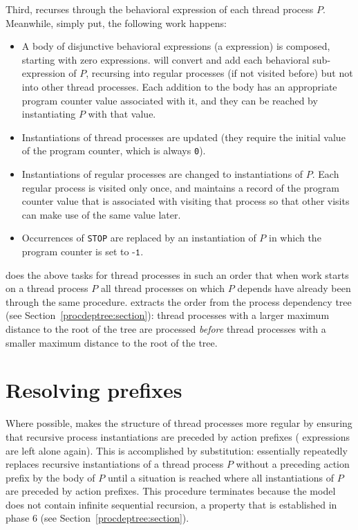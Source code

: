 Third, \lpeq{} recurses through the behavioral expression of each thread process $P$.
Meanwhile, simply put, the following work happens:
\begin{itemize}
\item A body of disjunctive behavioral expressions (a \choice{} expression) is composed, starting with zero expressions.
\lpeq{} will convert and add each behavioral sub-expression of $P$, recursing into regular processes (if not visited before) but not into other thread processes.
Each addition to the body has an appropriate program counter value associated with it, and they can be reached by instantiating $P$ with that value.
\item Instantiations of thread processes are updated (they require the initial value of the program counter, which is always \texttt{0}).
\item Instantiations of regular processes are changed to instantiations of $P$.
Each regular process is visited only once, and \lpeq{} maintains a record of the program counter value that is associated with visiting that process so that other visits can make use of the same value later.
\item Occurrences of \texttt{STOP} are replaced by an instantiation of $P$ in which the program counter is set to $\texttt{-1}$.
\end{itemize}

\lpeq{} does the above tasks for thread processes in such an order that when work starts on a thread process $P$ all thread processes on which $P$ depends have already been through the same procedure.
\lpeq{} extracts the order from the process dependency tree (see Section~\ref{procdeptree:section}): thread processes with a larger maximum distance to the root of the tree are processed \emph{before} thread processes with a smaller maximum distance to the root of the tree.

\section{Resolving prefixes} \label{prefix-resolution:section}

Where possible, \lpeq{} makes the structure of thread processes more regular by ensuring that recursive process instantiations are preceded by action prefixes (\pedi{} expressions are left alone again).
This is accomplished by substitution: \lpeq{} essentially repeatedly replaces recursive instantiations of a thread process $P$ without a preceding action prefix by the body of $P$ until a situation is reached where all instantiations of $P$ are preceded by action prefixes.
This procedure terminates because the model does not contain infinite sequential recursion, a property that is established in phase 6 (see Section~\ref{procdeptree:section}).

